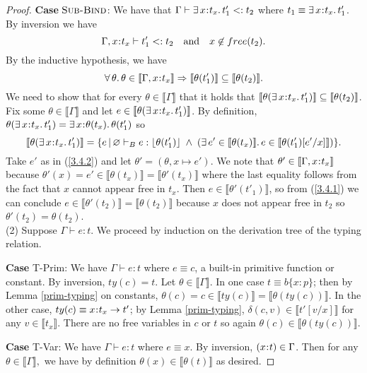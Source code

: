 \documentclass[11pt]{article}
\newcommand{\bind}{\hspace{0.05em}{:}\hspace{0.05em}} %
\newcommand{\col}{\mathbin{:}}       %
\newcommand{\lb}{\llbracket}         %
\newcommand{\rb}{\rrbracket}         %
\newcommand{\existype}[3]{\exists\, #1\bind #2.\, #3}
\newcommand{\functype}[3]{#1\bind #2 \rightarrow #3}
\begin{document}
\begin{proof}
{\bf Case} $\textsc{Sub-Bind}$: We have that $\Gamma \vdash \exists\, x\bind t_x.\, t'_1 <: t_2$ where $t_1 \equiv \exists\, x\bind t_x.\, t'_1$. By inversion we have
\[
\Gamma, x\bind t_x\vdash t'_1 <: t_2 \quad {\rm and}\quad x \not\in free(t_2).
\]
By the inductive hypothesis, we have
\begin{equation}
\forall\,\theta.\, \theta\in\lb\Gamma,x\bind t_x\rb \Rightarrow \lb\theta(t'_1)\rb \subseteq \lb\theta(t_2)\rb.
\label{3.4.1}	
\end{equation}
We need to show that for every $\theta \in \lb\Gamma\rb$ that it holds that $\lb \theta(\exists\, x\bind t_x.\, t'_1)\rb \subseteq \lb\theta(t_2)\rb$. Fix some $\theta \in \lb\Gamma\rb$ and let $e \in \lb \theta(\exists\, x\bind t_x.\, t'_1)\rb$. By definition, $\theta(\exists\, x\bind t_x.\, t'_1) = \exists\, x\bind \theta(t_x).\, \theta(t'_1)$ so
\begin{equation}\label{3.4.2}
\lb \theta(\existype{x}{t_x}{t'_1})\rb = \{ e \,|\, \varnothing \vdash_B e: \lfloor\theta(t'_1)\rfloor \;\wedge\; (\exists\, e' \in \lb\theta(t_x)\rb.\, e \in \lb\theta(t'_1)[e'/x]\rb)\}.
\end{equation}
Take $e'$ as in (\ref{3.4.2}) and let $\theta' = (\theta, x\mapsto e')$. We note that $\theta' \in \lb\Gamma,x\bind t_x\rb$ because $\theta'(x) = e' \in \lb\theta(t_x)\rb = \lb\theta'(t_x)\rb$ where the last equality follows from the fact that $x$ cannot appear free in $t_x$. Then $e \in \lb\theta'(t'_1)\rb$, so from (\ref{3.4.1}) we can conclude $e \in \lb\theta'(t_2)\rb = \lb\theta(t_2)\rb$ because $x$ does not appear free in $t_2$ so $\theta'(t_2)=\theta(t_2)$. \\

(2) Suppose $\Gamma \vdash e : t$. We proceed by induction on the derivation tree of the typing relation.

{\bf Case} {\sc T-Prim}: We have $\Gamma \vdash e : t$ where $e \equiv c$, a built-in primitive function or constant. By inversion, $ty(c) = t$. Let $\theta \in \lb \Gamma \rb$.
In one case $t \equiv b\{x\col p\}$; then by Lemma \ref{prim-typing} on constants, $\theta(c) = c \in \lb ty(c)\rb = \lb \theta(ty(c))\rb$. In the other case, $ty(c) \equiv \functype{x}{t_x}{t'}$; by Lemma \ref{prim-typing},
$\delta(c,v) \in \lb t'[v/x]\rb$ for any $v \in \lb t_x\rb.$ There are no free variables in $c$ or $t$ so again $\theta(c) \in \lb\theta(ty(c))\rb$.

{\bf Case} {\sc T-Var}: We have $\Gamma \vdash e : t$ where $e \equiv x$. By inversion, $(x\bind t) \in \Gamma$. Then for any $\theta \in \lb\Gamma\rb,$ we have by definition $\theta(x) \in \lb \theta(t)\rb$ as desired.


\end{proof}
\end{document}
